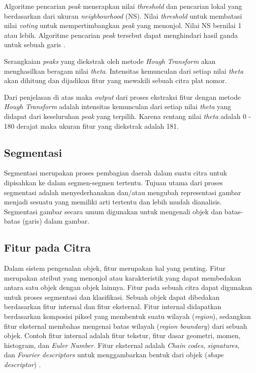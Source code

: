 \noindent Algoritme pencarian \textit{peak} menerapkan nilai \textit{threshold} dan pencarian lokal yang berdasarkan dari ukuran \textit{neighbourhood} (NS). Nilai \textit{threshold} untuk membatasi nilai \textit{voting} untuk mempertimbangkan \textit{peak} yang menonjol. Nilai NS bernilai 1 atau lebih. Algoritme pencarian \textit{peak} tersebut dapat menghindari hasil ganda untuk sebuah garis \cite{oechsle}.

\noindent Serangkaian \textit{peaks} yang diekstrak oleh metode \textit{Hough Transform} akan menghasilkan beragam nilai \textit{theta}. Intensitas kemunculan dari setiap nilai \textit{theta} akan dihitung dan dijadikan fitur yang mewakili sebuah citra plat nomor.

\noindent Dari penjelasan di atas maka \textit{output} dari proses ekstraksi fitur dengan metode \textit{Hough Transform} adalah intensitas kemunculan dari setiap nilai \textit{theta} yang didapat dari keseluruhan \textit{peak} yang terpilih. Karena rentang nilai \textit{theta} adalah 0 - 180 derajat maka ukuran fitur yang diekstrak adalah 181.\\

\subsection{Segmentasi}
\noindent Segmentasi merupakan proses pembagian daerah dalam suatu citra untuk dipisahkan ke dalam segmen-segmen tertentu. Tujuan utama dari proses segmentasi adalah menyederhanakan dan/atau mengubah representasi gambar menjadi sesuatu yang memiliki arti tertentu dan lebih mudah dianalisis. Segmentasi gambar secara umum digunakan untuk mengenali objek dan batas-batas (garis) dalam gambar.\\ 

\subsection{Fitur pada Citra}
\noindent Dalam sistem pengenalan objek, fitur merupakan hal yang penting. Fitur merupakan atribut yang menonjol atau karakteristik yang dapat membedakan antara satu objek dengan objek lainnya. Fitur pada sebuah citra dapat digunakan untuk proses segmentasi dan klasifikasi. Sebuah objek dapat dibedakan berdasarkan fitur internal dan fitur eksternal. Fitur internal didapatkan berdasarkan komposisi piksel yang membentuk suatu wilayah (\textit{region}), sedangkan fitur eksternal membahas mengenai batas wilayah (\textit{region boundary}) dari sebuah objek. Contoh fitur internal adalah fitur tekstur, fitur dasar geometri, momen, histogram, dan \textit{Euler Number}. Fitur eksternal adalah \textit{Chain codes}, \textit{signatures}, dan \textit{Fourier descriptors} untuk menggambarkan bentuk dari objek (\textit{shape descriptor}) \cite{gonzalez}.\\

